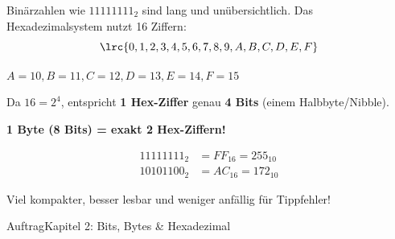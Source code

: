 {
\begin{frame}
\end{frame}}

\begin{frame}
Binärzahlen wie $11111111_2$ sind lang und unübersichtlich. 
\vspace{2mm}
Das Hexadezimalsystem nutzt 16 Ziffern:
$$\lrc{0,1,2,3,4,5,6,7,8,9,A,B,C,D,E,F}$$
\begin{center}
$A=10, B=11, C=12, D=13, E=14, F=15$
\end{center}
\end{frame}

\begin{frame}
Da $16 = 2^4$, entspricht \textbf{1 Hex-Ziffer} genau \textbf{4 Bits} (einem Halbbyte/Nibble).
\vspace{3mm}
\begin{center}
\textbf{1 Byte (8 Bits) = exakt 2 Hex-Ziffern!}
\end{center}
\begin{align*}
	11111111_2 &= FF_{16} = 255_{10} \\
	10101100_2 &= AC_{16} = 172_{10}
\end{align*}
\begin{center}
Viel kompakter, besser lesbar und weniger anfällig für Tippfehler!
\end{center}
\end{frame}

\begin{frame}{Auftrag}{Kapitel 2: Bits, Bytes \& Hexadezimal}
\vspace{3mm}
\end{frame}


